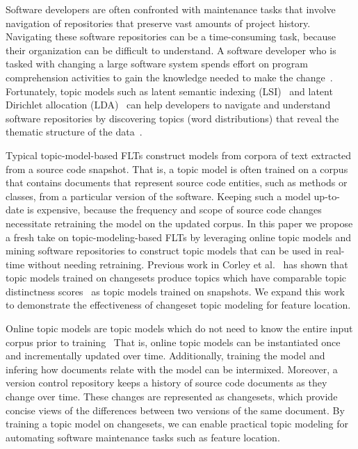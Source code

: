 
Software developers are often confronted with maintenance tasks that involve navigation of repositories that preserve vast amounts of project history.
Navigating these software repositories can be a time-consuming task, because their organization can be difficult to understand.
A software developer who is tasked with changing a large software system spends effort on program comprehension activities to gain the knowledge needed to make the change~\cite{Corbi:1989}.
Fortunately, topic models such as
latent semantic indexing (LSI)~\cite{Deerwester-etal:1990} and
latent Dirichlet allocation (LDA)~\cite{Blei-etal:2003}
can help developers to navigate and understand software repositories
by discovering topics (word distributions) that reveal the thematic structure
of the data~\cite{Linstead-etal:2007,Thomas-etal:2011,Hindle-etal:2012}.

Typical topic-model-based FLTs construct models from corpora of text extracted from a source code snapshot.
That is, a topic model is often trained on a corpus that contains documents that
represent source code entities, such as methods or classes, from a particular version of the software.
Keeping such a model up-to-date is expensive,
because the frequency and scope of source code changes necessitate retraining the model on the updated corpus.
In this paper we propose a fresh take on topic-modeling-based FLTs
by leveraging online topic models and mining software repositories
to construct topic models that can be used in real-time without needing retraining.
Previous work in Corley et al.~\cite{Corley-etal:2014} has shown that
topic models trained on changesets produce topics which have
comparable topic distinctness scores~\cite{Thomas-etal:2011} as
topic models trained on snapshots.
We expand this work to demonstrate the effectiveness of changeset topic modeling for feature location.

Online topic models are topic models which do not need to know
the entire input corpus prior to training~\cite{Hoffman-etal:2010,Radim:2011}
That is, online topic models can be instantiated once and incrementally updated over time.
Additionally, training the model and infering how documents relate with the model
can be intermixed.
Moreover, a version control repository keeps a history of source code documents as they change over time.
These changes are represented as changesets,
which provide concise views of the differences between two versions of the same document.
By training a topic model on changesets, we can enable practical topic
modeling for automating software maintenance tasks such as feature
location.

